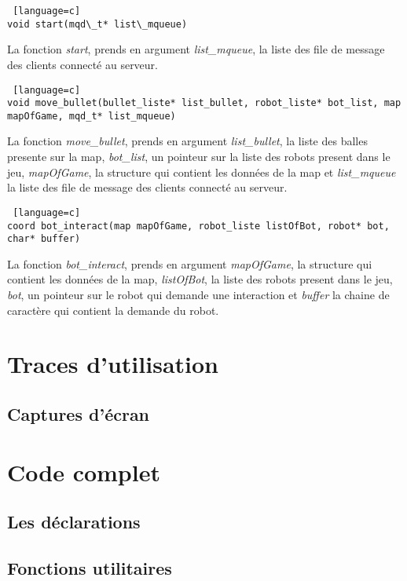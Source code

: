 \documentclass[a4paper, 11pt]{article}
\begin{document}
\begin {lstlisting} [language=c]
void start(mqd\_t* list\_mqueue)
\end{lstlisting}
La fonction \emph{start}, prends en argument \emph{list\_mqueue}, la liste des file de message des clients connecté au serveur.\\

\begin {lstlisting} [language=c]
void move_bullet(bullet_liste* list_bullet, robot_liste* bot_list, map mapOfGame, mqd_t* list_mqueue)
\end{lstlisting}
La fonction \emph{move_bullet}, prends en argument \emph{list_bullet}, la liste des balles presente sur la map, \emph{bot_list}, un pointeur sur la liste des robots present dans le jeu, \emph{mapOfGame}, la structure qui contient les données de la map et \emph{list_mqueue} la liste des file de message des clients connecté au serveur.\\

\begin {lstlisting} [language=c]
coord bot_interact(map mapOfGame, robot_liste listOfBot, robot* bot, char* buffer)
\end{lstlisting}
La fonction \emph{bot_interact}, prends en argument \emph{mapOfGame}, la structure qui contient les données de la map, \emph{listOfBot}, la liste des robots present dans le jeu, \emph{bot}, un pointeur sur le robot qui demande une interaction et \emph{buffer} la chaine de caractère qui contient la demande du robot.\\

\newpage
\section{Traces d'utilisation}
\subsection{Captures d'écran}

\newpage
\section{Code complet}
\subsection{Les déclarations}
%

\newpage
\subsection{Fonctions utilitaires}
%
\end{document}
